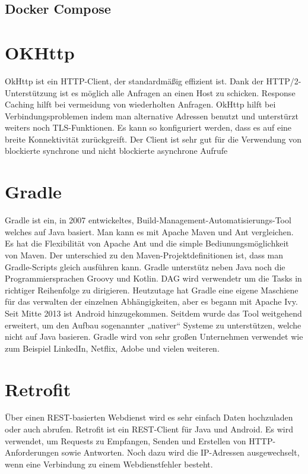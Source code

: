 \subsection{Docker Compose}


\section{OKHttp}
\author{Bozidar Spasenovic}
OkHttp ist ein HTTP-Client, der standardmäßig effizient ist.
 Dank der HTTP/2-Unterstützung ist es möglich alle Anfragen an einen Host zu schicken. 
Response Caching hilft bei vermeidung von wiederholten Anfragen.
OkHttp hilft bei Verbindungsproblemen indem man alternative Adressen benutzt und unterstürzt weiters noch TLS-Funktionen.
 Es kann so konfiguriert werden, dass es auf eine breite Konnektivität zurückgreift.
 Der Client ist sehr gut für die Verwendung von blockierte synchrone und nicht blockierte asynchrone Aufrufe 

\section{Gradle}
\author{Bozidar Spasenovic}
Gradle ist ein, in 2007 entwickeltes, Build-Management-Automatisierungs-Tool welches auf Java basiert.
Man kann es mit Apache Maven und Ant vergleichen.
Es hat die Flexibilität von Apache Ant und die simple Bediunungsmöglichkeit von Maven.
Der unterschied zu den  Maven-Projektdefinitionen ist, dass man Gradle-Scripts gleich ausführen kann.
 Gradle unterstütz neben Java noch die Programmiersprachen Groovy und Kotlin.
DAG wird verwendetr um die Tasks in richtiger Reihenfolge zu dirigieren.
Heutzutage hat Gradle eine eigene Maschiene für das verwalten der einzelnen Abhängigkeiten, aber es begann mit Apache Ivy.
Seit Mitte 2013 ist Android hinzugekommen. Seitdem wurde das Tool weitgehend erweitert, um den Aufbau sogenannter „nativer“ Systeme zu unterstützen, welche nicht auf Java basieren.
Gradle wird von sehr großen Unternehmen verwendet wie zum Beispiel LinkedIn, Netflix, Adobe und vielen weiteren.


\section{Retrofit}
\author{Bozidar Spasenovic}
Über einen REST-basierten Webdienst wird es sehr einfach Daten hochzuladen oder auch abrufen. 
Retrofit ist ein REST-Client für Java und Android.
Es wird verwendet, um Requests zu Empfangen, Senden und Erstellen von HTTP-Anforderungen sowie Antworten.
Noch dazu wird die IP-Adressen ausgewechselt, wenn eine Verbindung zu einem Webdienstfehler besteht.


